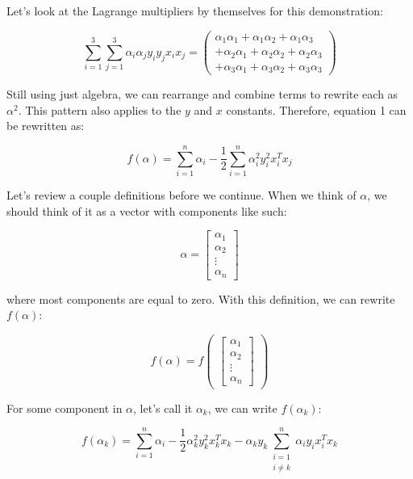 Let's look at the Lagrange multipliers by themselves for this demonstration:

\[
\sum\limits_{i=1}^{3} \sum\limits_{j=1}^{3} \alpha_i \alpha_j y_i y_j x_i x_j = 
\begin{pmatrix}
\alpha_1\alpha_1 + \alpha_1\alpha_2 + \alpha_1\alpha_3 
\\
+ \alpha_2\alpha_1 + \alpha_2\alpha_2 + \alpha_2\alpha_3 
\\
+ \alpha_3\alpha_1 + \alpha_3\alpha_2 + \alpha_3\alpha_3
\end{pmatrix}
\]

Still using just algebra, we can rearrange and combine terms to rewrite each as $\alpha^2$. This pattern also applies to the $y$ and $x$ constants. Therefore, equation 1 can be rewritten as:

\begin{equation} \label{eq:2}
f(\alpha) = \sum\limits_{i=1}^{n} \alpha_i - \frac{1}{2} \sum\limits_{i=1}^{n} \alpha_i^2 y_i^2 x_i^T x_j
\end{equation}

Let's review a couple definitions before we continue. When we think of $\alpha$, we should think of it as a vector with components like such:

\[
\alpha = 
\begin{bmatrix} 
\alpha_1 \\ 
\alpha_2 \\ 
\vdots \\
\alpha_n
\end{bmatrix}
\]

where most components are equal to zero. With this definition, we can rewrite $f(\alpha)$:

\[
    f(\alpha) = f\begin{pmatrix}\begin{bmatrix} 
\alpha_1 \\ 
\alpha_2 \\ 
\vdots \\
\alpha_n
\end{bmatrix}\end{pmatrix}
\]

For some component in $\alpha$, let's call it $\alpha_k$, we can write $f(\alpha_k)$:

\begin{equation} \label{eq:3}
    f(\alpha_k) = \sum\limits_{i=1}^{n}\alpha_i - \frac{1}{2}\alpha_k^2 y_k^2 x_k^Tx_k - \alpha_k y_k \sum_{\substack{i=1 \\ i \ne k}}^n \alpha_i y_i x_i^Tx_k
\end{equation}

